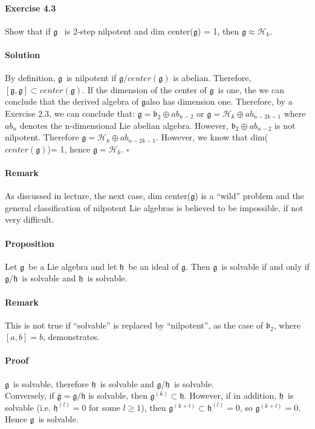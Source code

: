 \documentclass[11pt]{article}
\newcommand{\g}{\ensuremath{\mathfrak{g}}}
\newcommand{\h}{\ensuremath{\mathfrak{h}}}
\newcommand{\He}{\ensuremath{\mathcal{H}}}
\newcommand{\be}{\ensuremath{\mathfrak{b}_2}}
\begin{document}
\paragraph{Exercise 4.3} Show that if \g~ is 2-step nilpotent and dim center(\g) = 1, then
$\g \approx \He_k$.

\paragraph{Solution}
By definition, \g~is nilpotent if $\g/center(\g)$ is abelian. Therefore, 
$[\g,\g] \subset center(\g)$. If the dimension of the center of \g~is one, the we can conclude
that the derived algebra of \g also has dimension one. Therefore, by a Exercise 2.3, we can conclude
that: $\g = \be \oplus ab_{n-2}$ or $\g = \He_k \oplus ab_{n-2k-1}$ where $ab_n$ denotes
the n-dimensional Lie abelian algebra. However, $\be \oplus ab_{n-2}$ is not nilpotent. Therefore
$\g = \He_k \oplus ab_{n-2k-1}$. However, we know that dim($center(\g)$)= 1, hence $\g=\He_k$. $\square$





\paragraph{Remark} As discussed in lecture, the next case, dim center(\g) is a ``wild'' 
problem and the general
classification of nilpotent Lie algebras is believed to be impossible, if not very difficult.

\paragraph{Proposition} Let \g~be a Lie algebra and let \h~be an ideal of \g. Then \g~is
solvable if and only if \g/\h~is solvable and \h~is solvable.

\paragraph{Remark} This is not true if ``solvable'' is replaced by ``nilpotent'', as the case
of \be, where $[a,b]=b$, demonstrates.

\paragraph{Proof} \g~is solvable, therefore \h~is solvable and \g/\h~is solvable. \\
Conversely, if $\bar{\g} = \g/\h$ is solvable, then $\g^{(k)} \subset \h$. However, if in
addition, \h~is solvable (i.e. $\h^{(l)}=0$ for some $l \geq 1$), then
$\g^{(k+l)} \subset \h^{(l)} = 0$, so $\g^{(k+l)}=0$. Hence \g~is solvable.
\end{document}
